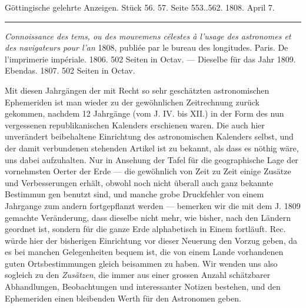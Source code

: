 \clearpage
{}
\hypertarget{native-497-lower}{}\label{native-497-lower}
\begin{center}
\small Göttingische gelehrte Anzeigen. Stück 56. 57. Seite 553..562. 1808. April 7.\\[3pt]
\rule{.72\linewidth}{.3pt}
\end{center}

\emph{Connoissance des tems, ou des mouvemens célestes à l'usage des astronomes et des navigateurs pour l'an} 1808, publiée par le bureau des longitudes. Paris. De l'imprimerie impériale. 1806. 502 Seiten in Octav. --- Dieselbe für das Jahr 1809. Ebendas. 1807. 502 Seiten in Octav.

Mit diesen Jahrgängen der mit Recht so sehr geschätzten astronomischen Ephemeriden ist man wieder zu der gewöhnlichen Zeitrechnung zurück gekommen, nachdem 12 Jahrgänge (vom J. IV. bis XII.) in der Form des nun vergessenen republikanischen Kalenders erschienen waren. Die auch hier unverändert beibehaltene Einrichtung des astronomischen Kalenders selbst, und der damit verbundenen stehenden Artikel ist zu bekannt, als dass es nöthig wäre, uns dabei aufzuhalten. Nur in Ansehung der Tafel für die geographische Lage der vornehmsten Oerter der Erde --- die gewöhnlich von Zeit zu Zeit einige Zusätze und Verbesserungen erhält, obwohl noch nicht überall auch ganz bekannte Bestimmun%
%
gen benutzt sind, und manche grobe Druckfehler von einem Jahrgange zum andern fortgepflanzt werden --- bemerken wir die mit dem J. 1809 gemachte Veränderung, dass dieselbe nicht mehr, wie bisher, nach den Ländern geordnet ist, sondern für die ganze Erde alphabetisch in Einem fortläuft. Rec. würde hier der bisherigen Einrichtung vor dieser Neuerung den Vorzug geben, da es bei manchen Gelegenheiten bequem ist, die von einem Lande vorhandenen guten Ortsbestimmungen gleich beisammen zu haben. Wir wenden uns also sogleich zu den \emph{Zusätzen}, die immer aus einer grossen Anzahl schätzbarer Abhandlungen, Beobachtungen und interessanter Notizen bestehen, und den Ephemeriden einen bleibenden Werth für den Astronomen geben.

